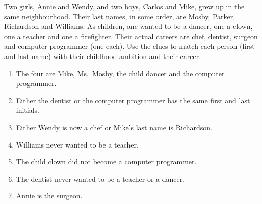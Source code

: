 Two girls, Annie and Wendy, and two boys, Carlos and Mike, grew up in the same neighbourhood. Their last names, in some order, are Mosby, Parker, Richardson and Williams. As children, one wanted to be a dancer, one a clown, one a teacher and one a firefighter. Their actual careers are chef, dentist, surgeon and computer programmer (one each). Use the clues to match each person (first and last name) with their childhood ambition and their career.
\begin{enumerate}
\item[(a)] The four are Mike, Ms.\ Mosby, the child dancer and the computer programmer.
\item[(b)] Either the dentist or the computer programmer has the same first and last initials.
\item[(c)] Either Wendy is now a chef or Mike's last name is Richardson.
\item[(d)] Williams never wanted to be a teacher.
\item[(e)] The child clown did not become a computer programmer.
\item[(f)] The dentist never wanted to be a teacher or a dancer.
\item[(g)] Annie is the surgeon.
\end{enumerate}
